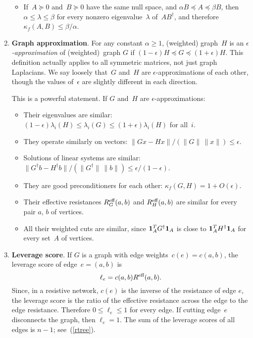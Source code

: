 \documentclass[11pt]{article}
\newcommand{\m}[1]{{\bf{#1}}}       %
\newcommand{\ones}{\m1}             %
\newcommand{\Reff}{R^{\mbox{\scriptsize eff}}}  %
\newcommand{\pinv}{^{\dagger}}          %
\begin{document}
\begin{enumerate}
\begin{itemize}
\item
If~$A\succeq 0$ and~$B\succeq 0$ have the same null space,
and $\alpha B \preceq A \preceq \beta B$,
then $\alpha \leq \lambda \leq \beta$
for every nonzero eigenvalue~$\lambda$ of~$AB\pinv$,
and therefore $\kappa_f(A,B) \leq \beta/\alpha$.

\end{itemize}

\item {\bf Graph approximation}.
For any constant $\alpha\geq 1$, 
(weighted) graph~$H$ is an {\em $\epsilon$-approximation} 
of (weighted)~graph $G$ if $(1-\epsilon) H \preceq G \preceq (1+\epsilon)H$.
This definition actually applies to all symmetric matrices, 
not just graph Laplacians.
We say loosely that~$G$ and~$H$ are $\epsilon$-approximations of each other,
though the values of~$\epsilon$ are slightly different in each direction.

This is a powerful statement.
If $G$ and~$H$ are $\epsilon$-approximations: 

\begin{itemize}

\item Their eigenvalues are similar: 
$(1-\epsilon)\lambda_i(H)\leq\lambda_i(G)\leq(1+\epsilon)\lambda_i(H)$
for all~$i$.

\item They operate similarly on vectors:
$\|Gx-Hx\|/(\|G\|\,\|x\|) \leq \epsilon$.

\item Solutions of linear systems are similar:
$\|G\pinv b - H\pinv b\|/(\|G\pinv\|\,\|b\|) \leq \epsilon/(1-\epsilon)$.

\item They are good preconditioners for each other:
$\kappa_f(G,H) = 1 + O(\epsilon)$.

\item Their effective resistances $\Reff_G(a,b)$ and $\Reff_H(a,b)$
are similar for every pair $a$, $b$ of vertices.

\item All their weighted cuts are similar, 
since $\ones_A^TG\pinv\ones_A$ is close to $\ones_A^TH\pinv\ones_A$ 
for every set~$A$ of vertices.

\end{itemize}

\item{\bf Leverage score}.
If $G$ is a graph with edge weights~$c(e) = c(a,b)$, 
the leverage score of edge~$e = (a,b)$ is
$$\ell_e=c(a,b)\Reff(a,b).$$
Since, in a resistive network, 
$c(e)$ is the inverse of the resistance  of edge $e$,
the leverage score is the ratio of the effective resistance
across the edge to the edge resistance. 
Therefore $0\leq\ell_e\leq 1$ for every edge.
If cutting edge~$e$ disconnects the graph, then $\ell_e=1$.
The sum of the leverage scores of all edges is $n-1$;
see~(\ref{rtree}).


\end{enumerate}
\end{document}
